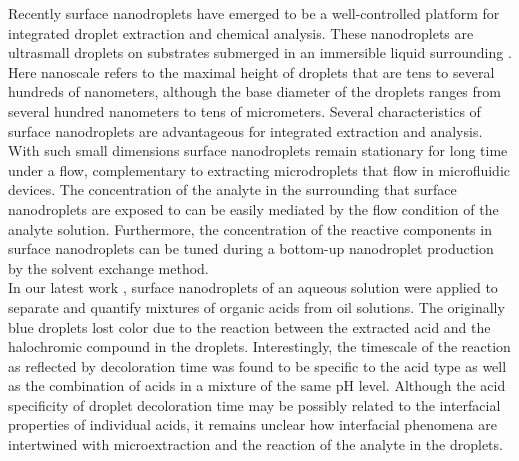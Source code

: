 \documentclass[journal=langd5,manuscript=article]{achemso}
\begin{document}
 


Recently surface nanodroplets have emerged to be a well-controlled platform for integrated droplet extraction and chemical analysis. These nanodroplets are ultrasmall droplets on substrates submerged in an immersible liquid surrounding \cite{zhang2015formation}. Here nanoscale refers to the maximal height of droplets that are tens to several hundreds of nanometers, although the base diameter of the droplets ranges from several hundred nanometers to tens of micrometers. \cite{li2019functional}  Several characteristics of surface nanodroplets are advantageous for integrated extraction and analysis. With such small dimensions surface nanodroplets remain stationary for long time under a flow, complementary to extracting microdroplets that flow in microfluidic devices. The concentration of the analyte in the surrounding that surface nanodroplets are exposed to can be easily mediated by the flow condition of the analyte solution. Furthermore, the concentration of the reactive components in surface nanodroplets can be tuned during a bottom-up nanodroplet production by the solvent exchange method. \cite{qian2019surface,li2018formation}  \\
In our latest work \cite{wei2020integrated}, surface nanodroplets of an aqueous solution were applied to separate and quantify mixtures of organic acids from oil solutions. The originally blue droplets lost color due to the reaction between the extracted acid and the halochromic compound in the droplets. Interestingly, the timescale of the reaction as reflected by decoloration time was found to be specific to the acid type as well as the combination of acids in a mixture of the same pH level. Although the acid specificity of droplet decoloration time may be possibly related to the interfacial properties of individual acids,  it remains unclear how interfacial phenomena are intertwined with microextraction and the reaction of the analyte in the droplets. \\
\end{document}
